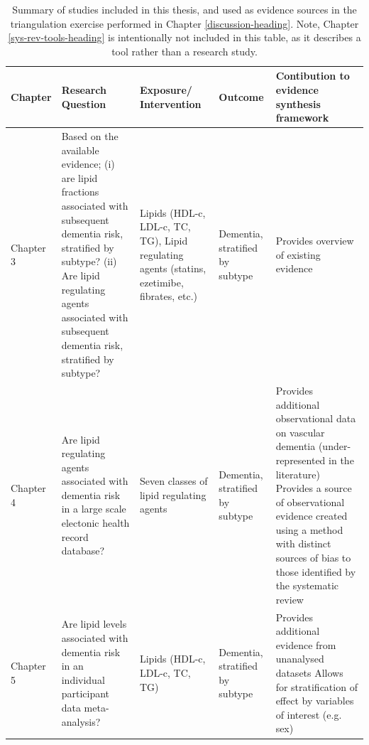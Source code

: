 \documentclass[a4paper, twoside]{templates/ociamthesis}
\begin{document}
\begin{table}[H]

\caption[Summary of studies included in this thesis]{\label{tab:thesisOverview-table}Summary of studies included in this thesis, and used as evidence sources in the triangulation exercise performed in Chapter \ref{discussion-heading}. Note, Chapter \ref{sys-rev-tools-heading} is intentionally not included in this table, as it describes a tool rather than a research study.}
\centering
\begin{tabular}[t]{>{\raggedright\arraybackslash}p{6em}>{\raggedright\arraybackslash}p{16em}>{\raggedright\arraybackslash}p{7em}>{\raggedright\arraybackslash}p{7em}>{\raggedright\arraybackslash}p{16em}}
\toprule
\textbf{Chapter} & \textbf{Research Question} & \textbf{Exposure/ Intervention} & \textbf{Outcome} & \textbf{Contibution to evidence synthesis framework}\\
\midrule
Chapter 3 & Based on the available evidence; \newline (i) are lipid fractions associated with subsequent dementia risk, stratified by subtype? \newline (ii) Are lipid regulating agents associated with subsequent dementia risk, stratified by subtype? \newline & Lipids (HDL-c, LDL-c, TC, TG), \newline \newline Lipid regulating agents (statins, ezetimibe, fibrates, etc.) & Dementia, stratified by subtype & Provides overview of existing evidence\\
\midrule
Chapter 4 & Are lipid regulating agents associated with dementia risk in a large scale electonic health record database? \newline & Seven classes of lipid regulating agents & Dementia, stratified by subtype & Provides additional observational data on vascular dementia (under-represented in the literature) \newline \newline Provides a source of observational evidence created using a method with distinct sources of bias to those identified by the systematic review\\
\midrule
Chapter 5 & Are lipid levels associated with dementia risk in an individual participant data meta-analysis? \newline & Lipids (HDL-c, LDL-c, TC, TG) & Dementia, stratified by subtype & Provides additional evidence from unanalysed datasets \newline \newline Allows for stratification of effect by variables of interest (e.g. sex)\\
\bottomrule
\end{tabular}
\end{table}
\end{document}
